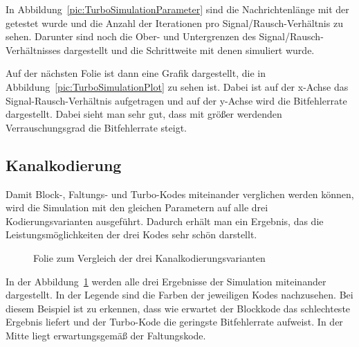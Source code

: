 In Abbildung~\ref{pic:TurboSimulationParameter} sind die Nachrichtenlänge mit der getestet wurde und die Anzahl der Iterationen pro Signal/Rausch-Verhältnis zu sehen. Darunter sind noch die Ober- und Untergrenzen des Signal/Rausch-Verhältnisses dargestellt und die Schrittweite mit denen simuliert wurde.

Auf der nächsten Folie ist dann eine Grafik dargestellt, die in Abbildung~\ref{pic:TurboSimulationPlot} zu sehen ist. Dabei ist auf der x-Achse das Signal-Rausch-Verhältnis aufgetragen und auf der y-Achse wird die Bitfehlerrate dargestellt. Dabei sieht man sehr gut, dass mit größer werdenden Verrauschungsgrad die Bitfehlerrate steigt.

\FloatBarrier
\subsection{Kanalkodierung}
\label{sec:visualization_simulations_channelcoding}
Damit Block-, Faltungs- und Turbo-Kodes miteinander verglichen werden können, wird die Simulation mit den gleichen Parametern auf alle drei Kodierungsvarianten ausgeführt. Dadurch erhält man ein Ergebnis, das die Leistungsmöglichkeiten der drei Kodes sehr schön darstellt.

\begin{figure}[th]
\centering
{}
\caption{Folie zum Vergleich der drei Kanalkodierungsvarianten}
\label{pic:ChannelcodingSimulation}
\end{figure}

In der Abbildung~\ref{pic:ChannelcodingSimulation} werden alle drei Ergebnisse der Simulation miteinander dargestellt. In der Legende sind die Farben der jeweiligen Kodes nachzusehen. Bei diesem Beispiel ist zu erkennen, dass wie erwartet der Blockkode das schlechteste Ergebnis liefert und der Turbo-Kode die geringste Bitfehlerrate aufweist. In der Mitte liegt erwartungsgemäß der Faltungskode.

